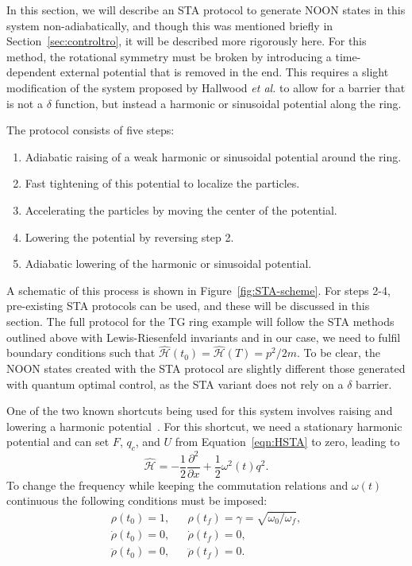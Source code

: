 In this section, we will describe an STA protocol to generate NOON states in this system non-adiabatically, and though this was mentioned briefly in Section~\ref{sec:controltro}, it will be described more rigorously here.
For this method, the rotational symmetry must be broken by introducing a time-dependent external potential that is removed in the end.
This requires a slight modification of the system proposed by Hallwood \textit{et al.} to allow for a barrier that is not a $\delta$ function, but instead a harmonic or sinusoidal potential along the ring.

The protocol consists of five steps:
\begin{enumerate}
\item Adiabatic raising of a weak harmonic or sinusoidal potential around the ring.
\item Fast tightening of this potential to localize the particles.
\item Accelerating the particles by moving the center of the potential.
\item Lowering the potential by reversing step 2.
\item Adiabatic lowering of the harmonic or sinusoidal potential.
\end{enumerate}
A schematic of this process is shown in Figure~\ref{fig:STA-scheme}.
For steps 2-4, pre-existing STA protocols can be used, and these will be discussed in this section.
The full protocol for the TG ring example will follow the STA methods outlined above with Lewis-Riesenfeld invariants and in our case, we need to fulfil boundary conditions such that $\mathcal{\hat H}(t_0) = \mathcal{\hat H}(T)=p^2/2m$.
To be clear, the NOON states created with the STA protocol are slightly different those generated with quantum optimal control, as the STA variant does not rely on a $\delta$ barrier.

One of the two known shortcuts being used for this system involves raising and lowering a harmonic potential~\cite{chen2010,chen20102}.
For this shortcut, we need a stationary harmonic potential and can set $F$, $q_c$, and $U$ from Equation~\eqref{eqn:HSTA} to zero, leading to
\begin{equation}
 \mathcal{\hat H}= -\frac{1}{2} \frac{\partial^2}{\partial x}+ \frac 1 2 \omega^2(t) q^2.
\end{equation}
\noindent To change the frequency while keeping the commutation relations and $\omega(t)$ continuous the following conditions must be imposed:
\begin{equation}
 \begin{array}{lcl}
\rho(t_0)=1, && \rho(t_f)=\gamma=\sqrt{\omega_0 / \omega_f},\\
\dot \rho(t_0)=0, && \dot \rho(t_f) =0, \\
\ddot \rho(t_0)=0, && \ddot \rho(t_f)=0.
\end{array} \label{eqn:squeeze}
\end{equation}

